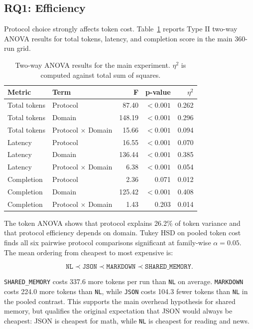 \documentclass[11pt]{article}
\newcommand{\NL}{\texttt{NL}\xspace}
\newcommand{\MD}{\texttt{MARKDOWN}\xspace}
\newcommand{\JS}{\texttt{JSON}\xspace}
\newcommand{\SM}{\texttt{SHARED\_MEMORY}\xspace}
\begin{document}
\subsection{RQ1: Efficiency}

Protocol choice strongly affects token cost. Table~\ref{tab:anova} reports Type II two-way ANOVA results for total tokens, latency, and completion score in the main 360-run grid.

\begin{table}[H]
\centering
\caption{Two-way ANOVA results for the main experiment. $\eta^2$ is computed against total sum of squares.}
\label{tab:anova}
\begin{tabular}{llrrr}
\toprule
Metric & Term & F & p-value & $\eta^2$ \\
\midrule
Total tokens & Protocol & 87.40 & $<0.001$ & 0.262 \\
Total tokens & Domain & 148.19 & $<0.001$ & 0.296 \\
Total tokens & Protocol $\times$ Domain & 15.66 & $<0.001$ & 0.094 \\
\midrule
Latency & Protocol & 16.55 & $<0.001$ & 0.070 \\
Latency & Domain & 136.44 & $<0.001$ & 0.385 \\
Latency & Protocol $\times$ Domain & 6.38 & $<0.001$ & 0.054 \\
\midrule
Completion & Protocol & 2.36 & 0.071 & 0.012 \\
Completion & Domain & 125.42 & $<0.001$ & 0.408 \\
Completion & Protocol $\times$ Domain & 1.43 & 0.203 & 0.014 \\
\bottomrule
\end{tabular}
\end{table}

The token ANOVA shows that protocol explains 26.2\% of token variance and that protocol efficiency depends on domain. Tukey HSD on pooled token cost finds all six pairwise protocol comparisons significant at family-wise $\alpha=0.05$. The mean ordering from cheapest to most expensive is:

\[
\NL \prec \JS \prec \MD \prec \SM.
\]

\SM costs 337.6 more tokens per run than \NL on average. \MD costs 224.0 more tokens than \NL, while \JS costs 104.3 fewer tokens than \NL in the pooled contrast. This supports the main overhead hypothesis for shared memory, but qualifies the original expectation that JSON would always be cheapest: JSON is cheapest for math, while \NL is cheapest for reading and news.
\end{document}
